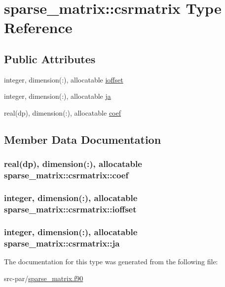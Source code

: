 \hypertarget{structsparse__matrix_1_1csrmatrix}{\section{sparse\-\_\-matrix\-:\-:csrmatrix Type Reference}
\label{structsparse__matrix_1_1csrmatrix}
}
\subsection*{Public Attributes}
\begin{DoxyCompactItemize}
\item 
integer, dimension(\-:), allocatable \hyperlink{structsparse__matrix_1_1csrmatrix_a5eeedab30cbd4d8853974d1d123657af}{ioffset}
\item 
integer, dimension(\-:), allocatable \hyperlink{structsparse__matrix_1_1csrmatrix_aba7625ddfb8baff76458280c3060bcfc}{ja}
\item 
real(dp), dimension(\-:), allocatable \hyperlink{structsparse__matrix_1_1csrmatrix_a4d30e2bc5e35d70781f4626f39abbc6d}{coef}
\end{DoxyCompactItemize}


\subsection{Member Data Documentation}
\hypertarget{structsparse__matrix_1_1csrmatrix_a4d30e2bc5e35d70781f4626f39abbc6d}{
\subsubsection[{coef}]{\setlength{\rightskip}{0pt plus 5cm}real(dp), dimension(\-:), allocatable sparse\-\_\-matrix\-::csrmatrix\-::coef}}\label{structsparse__matrix_1_1csrmatrix_a4d30e2bc5e35d70781f4626f39abbc6d}
\hypertarget{structsparse__matrix_1_1csrmatrix_a5eeedab30cbd4d8853974d1d123657af}{
\subsubsection[{ioffset}]{\setlength{\rightskip}{0pt plus 5cm}integer, dimension(\-:), allocatable sparse\-\_\-matrix\-::csrmatrix\-::ioffset}}\label{structsparse__matrix_1_1csrmatrix_a5eeedab30cbd4d8853974d1d123657af}
\hypertarget{structsparse__matrix_1_1csrmatrix_aba7625ddfb8baff76458280c3060bcfc}{
\subsubsection[{ja}]{\setlength{\rightskip}{0pt plus 5cm}integer, dimension(\-:), allocatable sparse\-\_\-matrix\-::csrmatrix\-::ja}}\label{structsparse__matrix_1_1csrmatrix_aba7625ddfb8baff76458280c3060bcfc}


The documentation for this type was generated from the following file\-:\begin{DoxyCompactItemize}
\item 
src-\/par/\hyperlink{sparse__matrix_8f90}{sparse\-\_\-matrix.\-f90}\end{DoxyCompactItemize}
